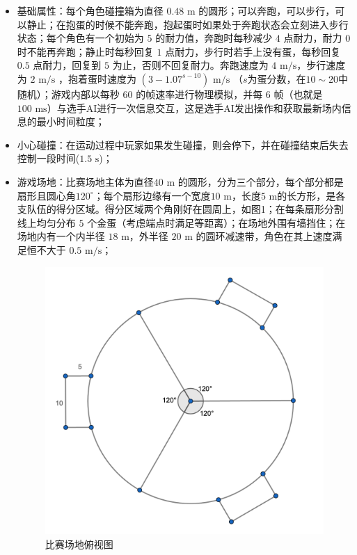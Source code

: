\documentclass[UTF8]{article}
\begin{document}
\begin{itemize}
\item
  基础属性：每个角色碰撞箱为直径 \(0.48 \text{ m}\)
  的圆形；可以奔跑，可以步行，可以静止；在抱蛋的时候不能奔跑，抱起蛋时如果处于奔跑状态会立刻进入步行状态；每个角色有一个初始为
  \(5\) 的耐力值，奔跑时每秒减少 \(4\) 点耐力，耐力 \( 0 \)
  时不能再奔跑；静止时每秒回复 \(1\)
  点耐力，步行时若手上没有蛋，每秒回复 \( 0.5 \) 点耐力，回复到 \(5 \)
  为止，否则不回复耐力。奔跑速度为 \(4\text{ m/s}\)，步行速度为
  \(2\text{ m/s}\) ，抱着蛋时速度为 \((3-1.07^{s-10})\text{ m/s}\)
  （\(s\)为蛋分数，在\(10\sim20\)中随机）；游戏内部以每秒 \(60\)
  的帧速率进行物理模拟，并每 \(6\) 帧（也就是
  \(100\text{ ms}\)）与选手AI进行一次信息交互，这是选手AI发出操作和获取最新场内信息的最小时间粒度；
\item
  小心碰撞：在运动过程中玩家如果发生碰撞，则会停下，并在碰撞结束后失去控制一段时间(\(1.5\text{ s}\))；
\item
  游戏场地：比赛场地主体为直径\( 40\text{ m}\)
  的圆形，分为三个部分，每个部分都是扇形且圆心角\(120^\circ\)；每个扇形边缘有一个宽度\( 10\text{ m}\)，长度\( 5\text{ m} \)的长方形，是各支队伍的得分区域。得分区域两个角刚好在圆周上，如图1；在每条扇形分割线上均匀分布
  \(5\)
  个金蛋（考虑端点时满足等距离）；在场地外围有墙挡住；在场地内有一个内半径
  \(18\text{ m}\)，外半径 \(20\text{ m}\)
  的圆环减速带，角色在其上速度满足恒不大于 \(0.5\text{ m/s}\)；
  \begin{figure}[ht]

    \centering
    \includegraphics[scale=0.15]{ground.png}
    \caption{比赛场地俯视图}
    \end{figure}
\end{itemize}
\end{document}
